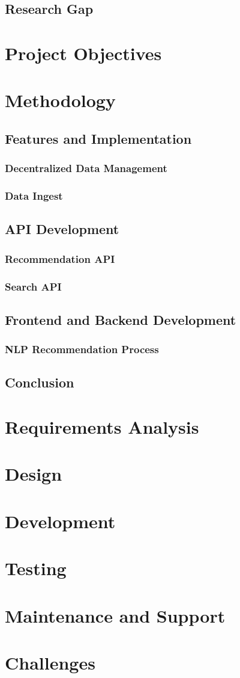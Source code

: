 \documentclass{article}
\begin{document}
\subsection{Research Gap}
\section{Project Objectives}
\section{Methodology}
\subsection{Features and Implementation}
\subsubsection{Decentralized Data Management}
\subsubsection{Data Ingest}
\subsection{API Development}
\subsubsection{Recommendation API}
\subsubsection{Search API}
\subsection{Frontend and Backend Development}
\subsubsection{NLP Recommendation Process}
\subsection{Conclusion}
\section{Requirements Analysis}
\section{Design}
\section{Development}
\section{Testing}
\section{Maintenance and Support}
\section{Challenges}
\end{document}
